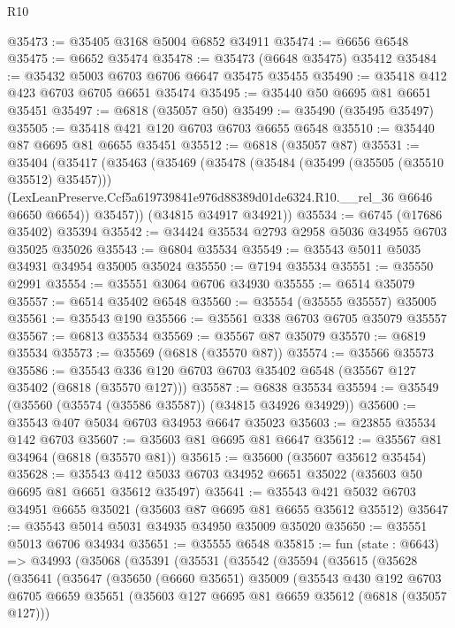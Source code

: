 \begin{lexlean}{R10}
\begin{coremodule}
@35473 := @35405 @3168 @5004 @6852 @34911
@35474 := @6656 @6548
@35475 := @6652 @35474
@35478 := @35473 (@6648 @35475) @35412
@35484 := @35432 @5003 @6703 @6706 @6647 @35475 @35455
@35490 := @35418 @412 @423 @6703 @6705 @6651 @35474
@35495 := @35440 @50 @6695 @81 @6651 @35451
@35497 := @6818 (@35057 @50)
@35499 := @35490 (@35495 @35497)
@35505 := @35418 @421 @120 @6703 @6703 @6655 @6548
@35510 := @35440 @87 @6695 @81 @6655 @35451
@35512 := @6818 (@35057 @87)
@35531 := @35404
    (@35417
      (@35463
        (@35469
          (@35478
            (@35484 (@35499 (@35505 (@35510 @35512) @35457)))
            (LexLeanPreserve.Ccf5a619739841e976d88389d01de6324.R10.__rel_36 @6646 @6650 @6654))
          @35457))
      (@34815 @34917 @34921))
@35534 := @6745 (@17686 @35402) @35394
@35542 := @34424 @35534 @2793 @2958 @5036 @34955 @6703 @35025 @35026
@35543 := @6804 @35534
@35549 := @35543 @5011 @5035 @34931 @34954 @35005 @35024
@35550 := @7194 @35534
@35551 := @35550 @2991
@35554 := @35551 @3064 @6706 @34930
@35555 := @6514 @35079
@35557 := @6514 @35402 @6548
@35560 := @35554 (@35555 @35557) @35005
@35561 := @35543 @190
@35566 := @35561 @338 @6703 @6705 @35079 @35557
@35567 := @6813 @35534
@35569 := @35567 @87 @35079
@35570 := @6819 @35534
@35573 := @35569 (@6818 (@35570 @87))
@35574 := @35566 @35573
@35586 := @35543 @336 @120 @6703 @6703 @35402 @6548 (@35567 @127 @35402 (@6818 (@35570 @127)))
@35587 := @6838 @35534
@35594 := @35549 (@35560 (@35574 (@35586 @35587)) (@34815 @34926 @34929))
@35600 := @35543 @407 @5034 @6703 @34953 @6647 @35023
@35603 := @23855 @35534 @142 @6703
@35607 := @35603 @81 @6695 @81 @6647
@35612 := @35567 @81 @34964 (@6818 (@35570 @81))
@35615 := @35600 (@35607 @35612 @35454)
@35628 := @35543 @412 @5033 @6703 @34952 @6651 @35022 (@35603 @50 @6695 @81 @6651 @35612 @35497)
@35641 := @35543 @421 @5032 @6703 @34951 @6655 @35021 (@35603 @87 @6695 @81 @6655 @35612 @35512)
@35647 := @35543 @5014 @5031 @34935 @34950 @35009 @35020
@35650 := @35551 @5013 @6706 @34934
@35651 := @35555 @6548
@35815 := fun (state : @6643) =>
  @34993
    (@35068
      (@35391
        (@35531
          (@35542
            (@35594
              (@35615
                (@35628
                  (@35641
                    (@35647
                      (@35650
                        (@6660 @35651)
                        @35009
                        (@35543
                          @430
                          @192
                          @6703
                          @6705
                          @6659
                          @35651
                          (@35603 @127 @6695 @81 @6659 @35612 (@6818 (@35057 @127)))

\end{coremodule}
\end{lexlean}
